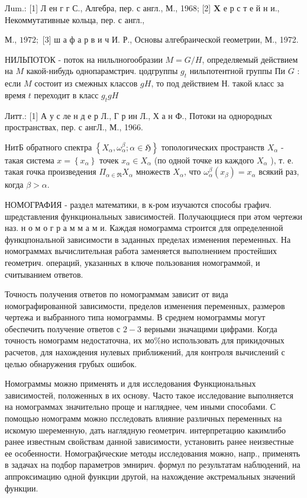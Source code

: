 \documentclass[10pt]{article}
\begin{document}
Лum.: [1] Л ен г г С., Алгебра, пер. с англ., М., 1968; [2] $\mathbf{X}$ е р с т е й н и., Некоммутативные кольца, пер. с англ.,

М., $1972 ;$ [3] ш а ф а р в и ч И. Р., Основы алгебраической геометрии, М., 1972.



НИЛЬПОТОК - поток на нильлногообразии $M=G / H$, определяемый действием на $M$ какой-нибудь однопарамстрич. цодгруппы $g_{t}$ нильпотентной группы Пи $G$ : если $M$ состоит из смежных классов $g H$, то под действием Н. такой класс за время $t$ переходит в класс $g_{t} g H$



Литт.: [1] А у с ле н д е р Л., Г р ин Л., Х а н Ф., Потоки на однородных пространствах, пер. с ангЛ., М., 1966.



НитБ обратного спектра $\left\{X_{\alpha}, \omega_{\alpha}^{\beta} ; \alpha \in \mathfrak{H}\right\}$ топологических пространств $X_{\alpha}$ - такая система $x=\left\{x_{\alpha}\right\}$ точек $x_{\alpha} \in X_{\alpha}$ (по одной точке из каждого $X_{\alpha}$ ), т. е. такая гочка произведения $\Pi_{\alpha \in \mathfrak{\Re}} X_{\alpha}$ множеств $X_{\alpha}$, что $\omega_{\alpha}^{\beta}\left(x_{\beta}\right)=x_{\alpha}$ всякий раз, когда $\beta>\alpha$.



НОМОГРАФИЯ - раздел математики, в к-ром изучаются способы графич. шредставления функциональных зависимостей. Получаюцциеся при әтом чертежи наз. н о м о г р а м м а м и. Каждая номограмма строится для определенной функцпональной зависимости в заданных пределах изменения переменных. На номограммах вычислительная работа заменяется выполнением простейших геометрич. операций, указанных в ключе пользования номограммой, и считыванием ответов.



Точность получения ответов по номограммам зависит от вида номографированной зависимости, пределов изменения переменных, размеров чертежа и выбранного типа номограммы. В среднем номограммы могут обеспечить получение ответов с $2-3$ верными значащими цифрами. Когда точность номограмм недостаточна, их мо\%но использовать для прикидочных расчетов, для нахождения нулевых приближений, для контроля вычислений с целью обнаружения грубых ошибок.



Номограммы можно применять и для исследования Функциональных зависимостей, положенных в их основу. Часто такое исследование выполняется на номограммах значительно проще и нагляднее, чем иными способами. С помощью номограмм можно псследовать влияние различных переменных на искомую шеременную, дать наглядную геометрич. интерпретацию какимлибо ранее известным свойствам данной зависимости, установить ранее неизвестные ее особенности. Номограқ̆ические методы исследования можно, напр., применять в задачах на подбор параметров эмнирич. формул по результатам наблюдений, на аппроксимацию одной функции другой, на нахождение әкстремальных значений функции.
\end{document}
